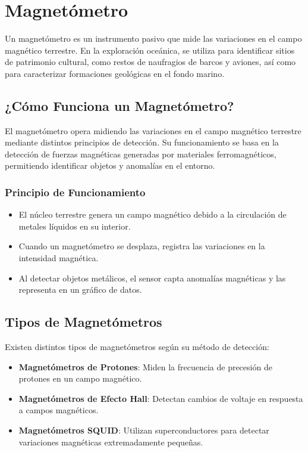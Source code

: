 	\section{\textbf{Magnetómetro}} Un magnetómetro es un instrumento pasivo que mide las variaciones en el campo magnético terrestre. En la exploración oceánica, se utiliza para identificar sitios de patrimonio cultural, como restos de naufragios de barcos y aviones, así como para caracterizar formaciones geológicas en el fondo marino.

\subsection{\textbf{¿Cómo Funciona un Magnetómetro?}}
El magnetómetro opera midiendo las variaciones en el campo magnético terrestre mediante distintos principios de detección. Su funcionamiento se basa en la detección de fuerzas magnéticas generadas por materiales ferromagnéticos, permitiendo identificar objetos y anomalías en el entorno.  

\subsubsection{\textbf{Principio de Funcionamiento}}
\begin{itemize}
	\item El núcleo terrestre genera un campo magnético debido a la circulación de metales líquidos en su interior.
	\item Cuando un magnetómetro se desplaza, registra las variaciones en la intensidad magnética.
	\item Al detectar objetos metálicos, el sensor capta anomalías magnéticas y las representa en un gráfico de datos.
\end{itemize}

\subsection{\textbf{Tipos de Magnetómetros}}
Existen distintos tipos de magnetómetros según su método de detección:
\begin{itemize}
	\item \textbf{Magnetómetros de Protones}: Miden la frecuencia de precesión de protones en un campo magnético.
	\item \textbf{Magnetómetros de Efecto Hall}: Detectan cambios de voltaje en respuesta a campos magnéticos.
	\item \textbf{Magnetómetros SQUID}: Utilizan superconductores para detectar variaciones magnéticas extremadamente pequeñas.
\end{itemize}
